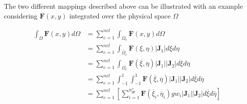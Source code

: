 \documentclass[11pt]{article}
\begin{document}
The two different mappings described above can be illustrated with an example
considering $ \textbf{F}(x,y)$ integrated over the physical space $\Omega$

\begin{equation*}
\begin{split}
\int_{\Omega} \textbf{F}(x,y)d\Omega & = \sum_{e=1}^{nel} \int_{\Omega_e}
\textbf{F}(x,y) d\Omega  \\
& = \sum_{e=1}^{nel} \int_{\widetilde{\Omega_e}}
\textbf{F}(\xi,\eta)|\textbf{J}_1| d\xi d\eta \\
& = \sum_{e=1}^{nel} \int_{\overline{\Omega_e}}
\textbf{F}(\overline\xi,\overline\eta)|\textbf{J}_1||\textbf{J}_2| d\overline\xi
d\overline\eta  \\
& = \sum_{e=1}^{nel} \int_{-1}^{1} \int_{-1}^{1}
\textbf{F}(\overline\xi,\overline\eta)|\textbf{J}_1||\textbf{J}_2| d\overline\xi
d\overline\eta  \\
& = \sum_{e=1}^{nel} \left[ \sum_{i=1}^{n_{gp}^e}
\textbf{F}(\overline\xi_i,\overline\eta_i) gw_i |\textbf{J}_1||\textbf{J}_2|
d\overline\xi d\overline\eta \right]
\end{split}
\end{equation*}
\end{document}
